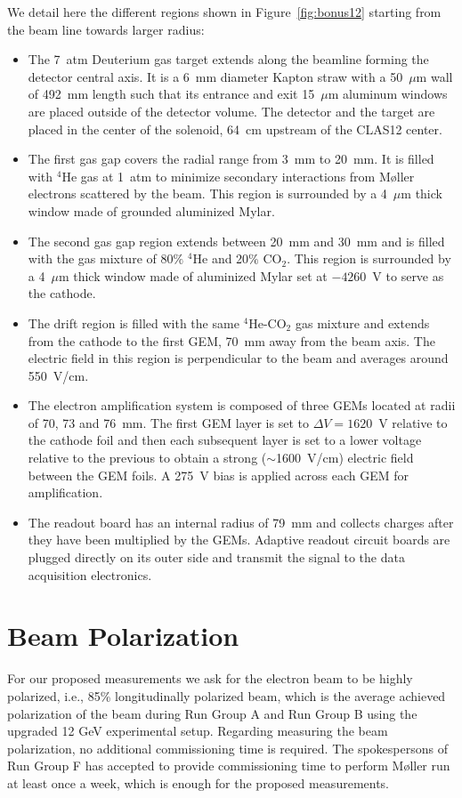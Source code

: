 We detail here the different regions shown in Figure~\ref{fig:bonus12} starting 
from the beam line towards larger radius:\\
\begin{itemize}
  \item The 7~atm Deuterium gas target extends along the beamline forming the 
     detector central axis. It is a 6~mm diameter Kapton straw with a 50~$\mu$m 
      wall of 492~mm length such that its entrance and exit 15~$\mu$m aluminum 
      windows are placed outside of the detector volume.  The detector and the 
      target are placed in the center of the solenoid, 64~cm upstream of the 
      CLAS12 center.
   \item The first gas gap covers the radial range from 3~mm to 20~mm. It is 
      filled with $^{4}$He gas at 1~atm to minimize secondary interactions from
      M\o{}ller electrons scattered by the beam. This region is surrounded by a 
      4~$\mu$m thick window made of grounded aluminized Mylar.
   \item The second gas gap region extends between 20~mm and 30~mm and is 
      filled with the gas mixture of 80$\%$ $^{4}$He and 20$\%$ CO$_2$. This 
      region is surrounded by a 4~$\mu$m thick window made of aluminized Mylar 
      set at $-4260$~V to serve as the cathode.
   \item The drift region is filled with the same $^4$He-CO$_2$ gas mixture and 
      extends from the cathode to the first GEM, 70~mm away from the beam axis.  
      The electric field in this region is perpendicular to the beam and 
      averages around 550~V/cm.
   \item The electron amplification system is composed of three GEMs located at 
      radii of 70, 73 and 76~mm. The first GEM layer is set to $\Delta 
      V=1620$~V relative to the cathode foil and then each subsequent layer is 
      set to a lower voltage relative to the previous to obtain a strong 
      ($\sim$1600~V/cm) electric field between the GEM foils. A 275~V bias is 
      applied across each GEM for amplification.
   \item The readout board has an internal radius of 79~mm and collects charges 
      after they have been multiplied by the GEMs. Adaptive readout circuit 
      boards are plugged directly on its outer side and transmit the signal to 
      the data acquisition electronics.
\end{itemize}



\section{Beam Polarization}
For our proposed measurements we ask for the electron beam to be highly 
polarized, i.e., 85\% longitudinally polarized beam, which is the average 
achieved polarization of the beam during Run Group A and Run Group B using the 
upgraded 12 GeV experimental setup. Regarding measuring the beam polarization, 
no additional commissioning time is required. The spokespersons of Run Group F 
\cite{skuhn} has accepted to provide commissioning time to perform M{\o}ller 
run at least once a week, which is enough for the proposed measurements.    

